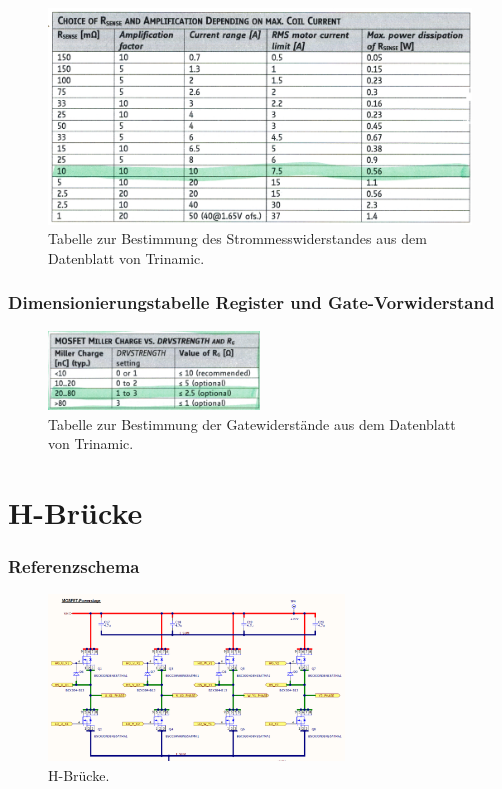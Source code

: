 \begin{appendix}
\begin{figure}[h!]
	\centering
	\includegraphics[width=\textwidth]{graphics/Tabelle_Shunts.png}
	\caption{Tabelle zur Bestimmung des Strommesswiderstandes aus dem Datenblatt von Trinamic.}
	\label{fig:Tabelle_Shunts}
\end{figure}

\subsubsection{Dimensionierungstabelle Register und Gate-Vorwiderstand}

\begin{figure}[h!]
	\centering
	\includegraphics[width=0.5\textwidth]{graphics/Tabelle_Gatewiderstaende.png}
	\caption{Tabelle zur Bestimmung der Gatewiderstände aus dem Datenblatt von Trinamic.}
	\label{fig:Tabelle_Gatewiderstaende}
\end{figure}

\newpage

\section{H-Brücke}\label{Appendix:H_Bruecke}

\subsubsection{Referenzschema}

\begin{figure}[h!]
	\centering
	\includegraphics[width=0.7\textwidth]{graphics/Referenzschema_10A70V}
	\caption{H-Brücke.}
	\label{fig:Schema_H_Bruecke_und_BLDC_Ref}
\end{figure}

\end{appendix}